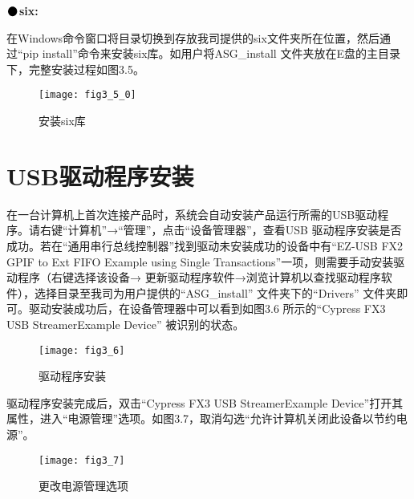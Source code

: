 \newpage
\noindent$\vcenter{\hbox{\huge$\bullet$}}$\quad\fontsize{12pt}{\baselineskip}\textbf{six:}

在Windows命令窗口将目录切换到存放我司提供的six文件夹所在位置，然后通过“pip install”命令来安装six库。如用户将ASG\_install 文件夹放在E盘的主目录下，完整安装过程如图3.5。
\begin{figure}[H]
\centering
\texttt{[image: fig3\_5\_0]}
\caption{安装six库}
\end{figure}

\vspace{0.8cm}
\section{USB\heiti 驱动程序安装}
在一台计算机上首次连接产品时，系统会自动安装产品运行所需的USB驱动程序。请右键“计算机”→“管理”，点击“设备管理器”，查看USB 驱动程序安装是否成功。若在“通用串行总线控制器”找到驱动未安装成功的设备中有“EZ-USB FX2 GPIF to Ext FIFO Example using Single Transactions”一项，则需要手动安装驱动程序（右键选择该设备→ 更新驱动程序软件→浏览计算机以查找驱动程序软件），选择目录至我司为用户提供的“ASG\_install” 文件夹下的“Drivers” 文件夹即可。驱动安装成功后，在设备管理器中可以看到如图3.6 所示的“Cypress FX3 USB StreamerExample Device” 被识别的状态。
\begin{figure}[htbp]
\centering
\texttt{[image: fig3\_6]}
\caption{驱动程序安装}
\end{figure}

驱动程序安装完成后，双击“Cypress FX3 USB StreamerExample Device”打开其属性，进入“电源管理”选项。如图3.7，取消勾选“允许计算机关闭此设备以节约电源”。
\begin{figure}[htbp]
\centering
\texttt{[image: fig3\_7]}
\caption{更改电源管理选项}
\end{figure}




